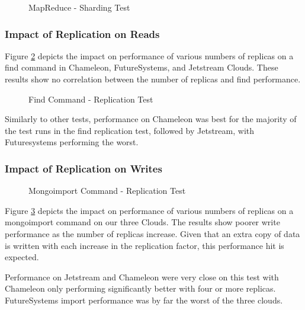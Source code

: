 \documentclass[sigconf]{acmart}
\begin{document}
\begin{figure}[htbp]
\centering
{}
\caption{MapReduce - Sharding Test}
\label{fig:shard-mapreduce}
\end{figure}


\subsubsection{Impact of Replication on Reads}



Figure \ref{fig:replica-find} depicts the impact on performance of
various numbers of replicas on a find command in Chameleon,
FutureSystems, and Jetstream Clouds.  These results show no
correlation between the number of replicas and find performance.

\begin{figure}[htbp]
\centering
{}
\caption{Find Command - Replication Test}
\label{fig:replica-find}
\end{figure}

Similarly to other tests, performance on Chameleon was best for the
majority of the test runs in the find replication test, followed by
Jetstream, with Futuresystems performing the worst.


\subsubsection{Impact of Replication on Writes}


\begin{figure}[htbp]
\centering
{}
\caption{Mongoimport Command - Replication Test}
\label{fig:replica-import}
\end{figure}


Figure \ref{fig:replica-import} depicts the impact on performance of
various numbers of replicas on a mongoimport command on our three
Clouds.  The results show poorer write performance as the number of
replicas increase.  Given that an extra copy of data is written with
each increase in the replication factor, this performance hit is
expected.

Performance on Jetstream and Chameleon were very close on this test
with Chameleon only performing significantly better with four or more
replicas.  FutureSystems import performance was by far the worst of
the three clouds.
\end{document}
